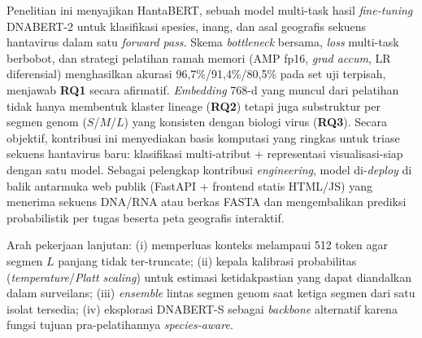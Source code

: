 \documentclass[conference]{IEEEtran}
\begin{document}
Penelitian ini menyajikan HantaBERT, sebuah model multi-task hasil
\emph{fine-tuning} DNABERT-2 untuk klasifikasi spesies, inang, dan asal
geografis sekuens hantavirus dalam satu \emph{forward pass}. Skema
\emph{bottleneck} bersama, \emph{loss} multi-task berbobot, dan
strategi pelatihan ramah memori (AMP fp16, \emph{grad accum}, LR
diferensial) menghasilkan akurasi 96{,}7\%/91{,}4\%/80{,}5\% pada set uji
terpisah, menjawab \textbf{RQ1} secara afirmatif. \emph{Embedding}
768-d yang muncul dari pelatihan tidak hanya membentuk klaster lineage
(\textbf{RQ2}) tetapi juga substruktur per segmen genom ($S$/$M$/$L$)
yang konsisten dengan biologi virus (\textbf{RQ3}). Secara objektif,
kontribusi ini menyediakan basis komputasi yang ringkas untuk triase
sekuens hantavirus baru: klasifikasi multi-atribut + representasi
visualisasi-siap dengan satu model. Sebagai pelengkap kontribusi
\emph{engineering}, model di-\emph{deploy} di balik antarmuka web
publik (FastAPI + frontend statis HTML/JS) yang menerima sekuens
DNA/RNA atau berkas FASTA dan mengembalikan prediksi probabilistik per tugas
beserta peta geografis interaktif.

Arah pekerjaan lanjutan: (i) memperluas konteks melampaui 512 token
agar segmen $L$ panjang tidak ter-truncate; (ii) kepala kalibrasi
probabilitas (\emph{temperature}/\emph{Platt scaling}) untuk estimasi
ketidakpastian yang dapat diandalkan dalam surveilans; (iii)
\emph{ensemble} lintas segmen genom saat ketiga segmen dari satu isolat
tersedia; (iv) eksplorasi DNABERT-S sebagai \emph{backbone} alternatif
karena fungsi tujuan pra-pelatihannya \emph{species-aware}.
\end{document}
